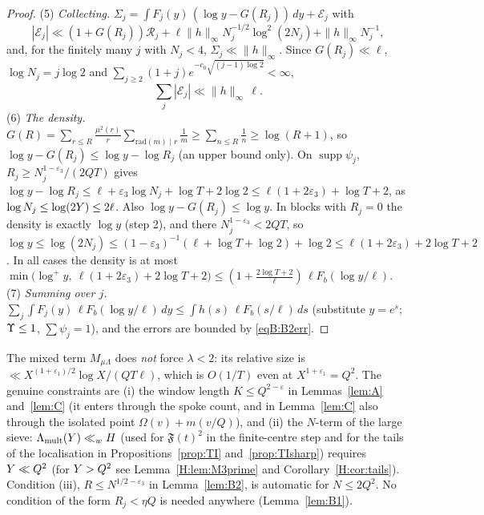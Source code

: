 \begin{proof}
(5) \emph{Collecting.} $\Sigma_j=\int F_j(y)\,(\log y-G(R_j))\,dy+\mathcal E_j$ with
\[
 |\mathcal E_j|\ll(1+G(R_j))\mathcal R_j+\ell\|h\|_\infty N_j^{-1/2}\log^2(2N_j)+\|h\|_\infty N_j^{-1},
\]
and, for the finitely many $j$ with
$N_j<4$, $\Sigma_j\ll\|h\|_\infty$. Since $G(R_j)\ll\ell$, $\log N_j=j\log2$ and $\sum_{j\ge2}(1+j)e^{-c_0\sqrt{(j-1)\log2}}<\infty$,
\begin{equation}\label{eqB:B2err}
 \sum_j|\mathcal E_j|\ll\|h\|_\infty\,\ell .
\end{equation}
(6) \emph{The density.} $G(R)=\sum_{r\le R}\frac{\mu^2(r)}r\sum_{\mathrm{rad}(m)\mid r}\frac1m\ge\sum_{n\le R}\frac1n\ge\log(R+1)$, so
$\log y-G(R_j)\le\log y-\log R_j$ (an upper bound only). On $\operatorname{supp}\psi_j$, $R_j\ge N_j^{1-\varepsilon_3}/(2QT)$ gives
$\log y-\log R_j\le\ell+\varepsilon_3\log N_j+\log T+2\log2\le\ell(1+2\varepsilon_3)+\log T+2$, as $\log N_j\le\log(2Y)\le2\ell$. Also
$\log y-G(R_j)\le\log y$. In blocks with $R_j=0$ the density is exactly $\log y$ (step 2), and there $N_j^{1-\varepsilon_3}<2QT$, so
$\log y\le\log(2N_j)\le(1-\varepsilon_3)^{-1}(\ell+\log T+\log2)+\log2\le\ell(1+2\varepsilon_3)+2\log T+2$. In all cases the density is at most
$\min\big(\log^+y,\ \ell(1+2\varepsilon_3)+2\log T+2\big)\le(1+\frac{2\log T+2}\ell)\,\ell F_b(\log y/\ell)$.
(7) \emph{Summing over $j$.} $\sum_j\int F_j(y)\,\ell F_b(\log y/\ell)\,dy\le\int h(s)\,\ell F_b(s/\ell)\,ds$ (substitute $y=e^s$; $\Upsilon\le1$,
$\sum\psi_j=1$), and the errors are bounded by \eqref{eqB:B2err}.
\end{proof}

\begin{remark}\label{rem:bandwidth}
The mixed term $M_{\mu\Lambda}$ does \emph{not} force $\lambda<2$: its relative size is
$\ll X^{(1+\varepsilon_1)/2}\log X/(QT\ell)$, which is $O(1/T)$ even at $X^{1+\varepsilon_1}=Q^2$. The genuine constraints are (i) the window length
$K\le Q^{2-\varepsilon}$ in Lemmas~\ref{lem:A} and~\ref{lem:C} (it enters through the spoke count, and in Lemma~\ref{lem:C} also through
the isolated point $\Omega(v)+m(v/Q)$), and (ii) the $N$-term of the large sieve:
$\Lambda_{\mathrm{mult}}(Y)\ll_wH$ (used for $\mathfrak F(t)^2$ in the finite-centre step and for the tails of the localisation in Propositions~\ref{prop:TI}
and~\ref{prop:TIsharp}) requires
$Y\ll Q^2$ (for $Y>Q^2$ see Lemma~\ref{H:lem:M3prime} and Corollary~\ref{H:cor:tails}). Condition (iii), $R\le N^{1/2-\varepsilon_3}$ in Lemma~\ref{lem:B2}, is automatic for $N\le2Q^2$. No condition of the form
$R_j<\eta Q$ is needed anywhere (Lemma~\ref{lem:B1}).
\end{remark}

